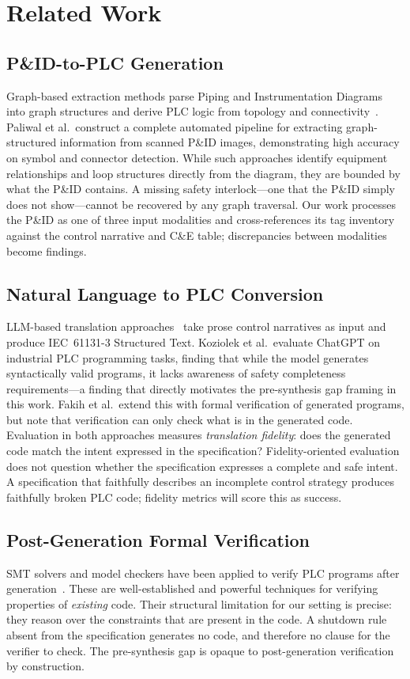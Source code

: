 \documentclass[conference]{IEEEtran}
\begin{document}
\section{Related Work}

\subsection{P\&ID-to-PLC Generation}
Graph-based extraction methods parse Piping and Instrumentation
Diagrams into graph structures and derive PLC logic from topology and
connectivity~\cite{paliwal2021digitize}. Paliwal et al.\ construct
a complete automated pipeline for extracting graph-structured information
from scanned P\&ID images, demonstrating high accuracy on symbol and
connector detection. While such approaches identify equipment relationships
and loop structures directly from the diagram, they are bounded by
what the P\&ID contains. A missing safety interlock---one that the
P\&ID simply does not show---cannot be recovered by any graph traversal.
Our work processes the P\&ID as one of three input modalities and
cross-references its tag inventory against the control narrative and
C\&E table; discrepancies between modalities become findings.

\subsection{Natural Language to PLC Conversion}
LLM-based translation approaches~\cite{koziolek2023chatgpt,fakih2024llm4plc}
take prose control narratives as input and produce IEC~61131-3 Structured
Text. Koziolek et al.\ evaluate ChatGPT on industrial PLC programming
tasks, finding that while the model generates syntactically valid programs,
it lacks awareness of safety completeness requirements---a finding that
directly motivates the pre-synthesis gap framing in this work.
Fakih et al.\ extend this with formal verification of generated programs,
but note that verification can only check what is in the generated code.
Evaluation in both approaches measures \emph{translation fidelity}:
does the generated code match the intent expressed in the specification?
Fidelity-oriented evaluation does not question whether the specification
expresses a complete and safe intent. A specification that faithfully
describes an incomplete control strategy produces faithfully broken PLC
code; fidelity metrics will score this as success.

\subsection{Post-Generation Formal Verification}
SMT solvers and model checkers have been applied to verify PLC programs
after generation~\cite{mery2011event_b,clarke1999model}. These are
well-established and powerful techniques for verifying properties of
\emph{existing} code. Their structural limitation for our setting is
precise: they reason over the constraints that are present in the code.
A shutdown rule absent from the specification generates no code, and
therefore no clause for the verifier to check. The pre-synthesis gap
is opaque to post-generation verification by construction.
\end{document}
